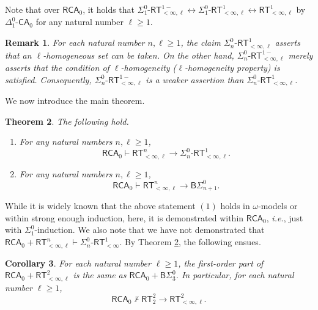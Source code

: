 \documentclass[10pt,reqno]{amsart}
\newtheorem{theorem}{Theorem}
\newtheorem{corollary}[theorem]{Corollary}
\newtheorem{remark}[theorem]{Remark}
\numberwithin{equation}{section}
\begin{document}
Note that over $\mathsf{RCA}_0$, it holds that $\Sigma_{1}^{0}\text{-}\mathsf{RT}_{<\infty,\ell}^{1-}\leftrightarrow\Sigma_{1}^{0}\text{-}\mathsf{RT}_{<\infty,\ell}^{1}\leftrightarrow\mathsf{RT}_{<\infty,\ell}^{1}$ by $\Delta_{1}^{0}\text{-}\mathsf{CA}_0$ for any natural number $\ell \ge 1$.


\begin{remark}
For each natural number $n,\ell \ge 1$, the claim $\Sigma_{n}^{0}\text{-}\mathsf{RT}_{<\infty,\ell}^{1}$ asserts that an $\ell$-homogeneous set can be taken. On the other hand, $\Sigma_{n}^{0}\text{-}\mathsf{RT}_{<\infty,\ell}^{1-}$ merely asserts that the condition of $\ell$-homogeneity ($\ell$-homogeneity property) is satisfied. 
Consequently, $\Sigma_{n}^{0}\text{-}\mathsf{RT}_{<\infty,\ell}^{1-}$ is a weaker assertion than $\Sigma_{n}^{0}\text{-}\mathsf{RT}_{<\infty,\ell}^{1}$.
\end{remark}
We now introduce the main theorem.
\begin{theorem}\label{thm:main}
The following hold.


\begin{enumerate}[topsep=0.5em,itemsep=0.5em]
\item For any natural numbers $n, \ell \ge 1$,
\[ \mathsf{RCA}_0\vdash\mathsf{RT}_{<\infty,\ell}^{n}\rightarrow\Sigma_{n}^{0}\text{-}\mathsf{RT}_{<\infty,\ell}^{1}. \]


\item For any natural numbers $n, \ell \ge 1$,
\[
\mathsf{RCA}_0\vdash\mathsf{RT}_{<\infty,\ell}^{n}\rightarrow\mathsf{B}\Sigma_{n+1}^{0}.
\]
\end{enumerate}
\end{theorem}
While it is widely known that the above statement $(1)$ holds in $\omega$-models or within strong enough induction, here, it is demonstrated within $\mathsf{RCA}_0$, \textit{i.e.}, just with $\Sigma^{0}_{1}$-induction.   
We also note that we have not demonstrated that $\mathsf{RCA}_0+\mathsf{RT}_{<\infty,\ell}^{n}\vdash\Sigma_{n}^{0}\text{-}\mathsf{RT}_{<\infty}^{1}$.
By Theorem \ref{thm:main}, the following ensues.


\begin{corollary}\label{corollary}
For each natural number $\ell \ge 1$, the first-order part of $\mathsf{RCA}_0+\mathsf{RT}_{<\infty,\ell}^{2}$ is the same as $\mathsf{RCA}_0+\mathsf{B}\Sigma_{3}^{0}$.
In particular, for each natural number $\ell \ge 1$,
\[\mathsf{RCA}_0\not\vdash\mathsf{RT}_{2}^{2}\rightarrow\mathsf{RT}_{<\infty,\ell}^{2}.\]
\end{corollary}
\end{document}
